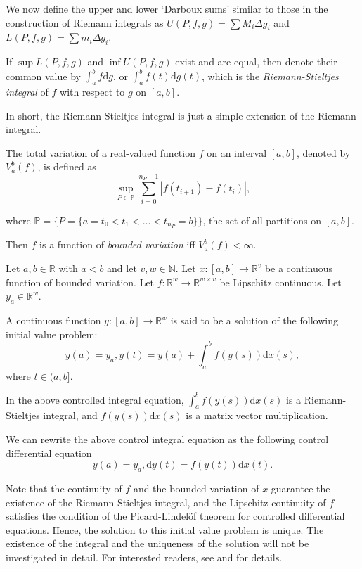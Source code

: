 \documentclass[a4paper,11pt,titlepage]{article}
\theoremstyle{definition}
\theoremstyle{plain}
\theoremstyle{remark}
\begin{document}
We now define the upper and lower ‘Darboux sums’ similar to those in the construction of Riemann integrals as $U(P,f,g)=\sum M_i\Delta g_i$ and $L(P,f,g)=\sum m_i\Delta g_i$.

If $\sup L(P,f,g)$ and $\inf U(P,f,g)$ exist and are equal, then denote their common value by $\int^b_af\mathrm{d}g$, or $\int^b_af(t)\mathrm{d}g(t)$, which is the \textit{Riemann-Stieltjes integral} of $f$ with respect to $g$ on $[a,b]$.

In short, the Riemann-Stieltjes integral is just a simple extension of the Riemann integral.

The total variation of a real-valued function $f$ on an interval $[a,b]$, denoted by $V_a^b(f)$, is defined as
$$\sup_{P\in\mathbb{P}}\sum_{i=0}^{n_P-1}\left|f(t_{i+1})-f(t_i)\right|,$$

where $\mathbb{P}=\{P=\{a=t_0<t_1<...<t_{n_P}=b\}\}$, the set of all partitions on $[a,b]$.

Then $f$ is a function of \textit{bounded variation} iff $V_a^b(f)<\infty$.

Let $a,b\in\mathbb{R}$ with $a<b$ and let $v,w\in\mathbb{N}$. Let $x:[a,b]\rightarrow\mathbb{R}^v$ be a continuous function of bounded variation. Let $f:\mathbb{R}^w\rightarrow\mathbb{R}^{w\times v}$ be Lipschitz continuous. Let $y_a\in\mathbb{R}^w$.

A continuous function $y:[a,b]\rightarrow\mathbb{R}^w$ is said to be a solution of the following initial value problem:
$$y(a)=y_a, y(t)=y(a)+\int_a^bf(y(s))\mathrm{d}x(s),$$
where $t\in(a,b].$ \cite{kidger2022neural}

In the above controlled integral equation, $\int_a^bf(y(s))\mathrm{d}x(s)$ is a Riemann-Stieltjes integral, and $f(y(s))\mathrm{d}x(s)$ is a matrix vector multiplication.

We can rewrite the above control integral equation as the following control differential equation
$$y(a)=y_a, \mathrm{d}y(t) = f(y(t))\mathrm{d}x(t).$$

Note that the continuity of $f$ and the bounded variation of $x$ guarantee the existence of the Riemann-Stieltjes integral, and the Lipschitz continuity of $f$ satisfies the condition of the Picard-Lindelöf theorem for controlled differential equations. Hence, the solution to this initial value problem is unique. The existence of the integral and the uniqueness of the solution will not be investigated in detail. For interested readers, see \cite{kidger2022neural} and \cite{rudin1953} for details.
\end{document}
